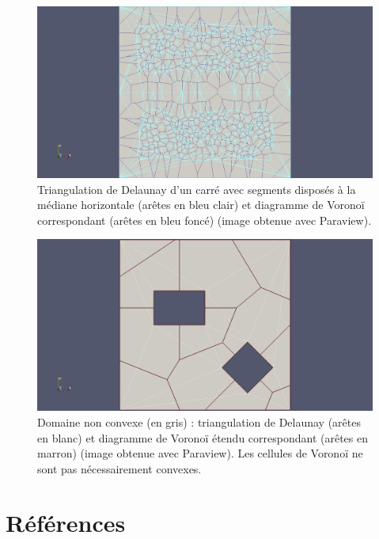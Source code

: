 \documentclass[12pt,a4paper]{report}
\begin{document}
\begin{figure}[htbp]
\begin{center}
\includegraphics[scale=0.35, viewport=530 0 1680 1129, clip]{del_vor.jpg}
\caption{Triangulation de Delaunay d'un carré avec segments disposés à la médiane horizontale (arêtes en bleu clair) et diagramme de Voronoï correspondant (arêtes en bleu foncé) (image obtenue avec Paraview).}
\label{del_vor}
\end{center}
\end{figure}


\begin{center}
\begin{figure}[t]
\includegraphics[scale=0.35, viewport=530 0 1680 1129, clip]{sq_del_vor.jpg}
\caption{Domaine non convexe (en gris) : triangulation de Delaunay (arêtes en blanc) et diagramme de Voronoï étendu correspondant (arêtes en marron) (image obtenue avec Paraview). Les cellules de Voronoï ne sont pas nécessairement convexes.}
\label{sq_del_vor}
\end{figure}
\end{center}
\clearpage

\section{Références}
\vspace*{1cm}
\end{document}
